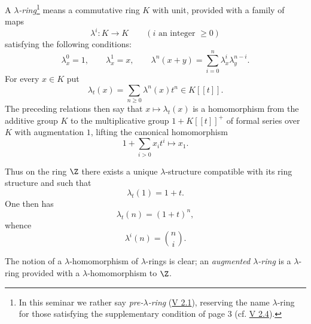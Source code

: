 A \emph{$\lambda$-ring}\footnote{In this seminar we rather say \emph{pre-$\lambda$-ring} (\hyperlink{sga6.e05.def.2-1}{V 2.1}), reserving the name $\lambda$-ring for those satisfying the supplementary condition of page 3 (cf. \hyperlink{sga6.e05.def.2-4}{V 2.4}).} means a commutative ring $K$ with unit, provided with a family of maps
\begin{equation}\tag{1.1}
\lambda^i:K\longrightarrow K\qquad (i\text{ an integer }\geq 0)
\end{equation}
satisfying the following conditions:
\begin{equation}\tag{1.2}
\lambda_x^0=1,\qquad \lambda_x^1=x,\qquad
\lambda^n(x+y)=\sum_{i=0}^n \lambda^i_x\lambda^{n-i}_y .
\end{equation}
For every $x\in K$ put
\begin{equation}\tag{1.3}
\lambda_t(x)=\sum_{n\geq 0}\lambda^n(x)t^n\in K[[t]].
\end{equation}
The preceding relations then say that $x\mapsto \lambda_t(x)$ is a homomorphism from the additive group $K$ to the multiplicative group $1+K[[t]]^+$ of formal series over $K$ with augmentation $1$, lifting the canonical homomorphism
\[
1+\sum_{i>0}x_it^i\longmapsto x_1.
\]

Thus on the ring $\Z$ there exists a unique $\lambda$-structure compatible with its ring structure and such that
\begin{equation}\tag{1.4}
\lambda_t(1)=1+t .
\end{equation}
One then has
\begin{equation}\tag{1.5}
\lambda_t(n)=(1+t)^n,
\end{equation}
whence
\[
\lambda^i(n)=\binom{n}{i}.
\]

The notion of a $\lambda$-homomorphism of $\lambda$-rings is clear; an \emph{augmented $\lambda$-ring} is a $\lambda$-ring provided with a $\lambda$-homomorphism to $\Z$.

